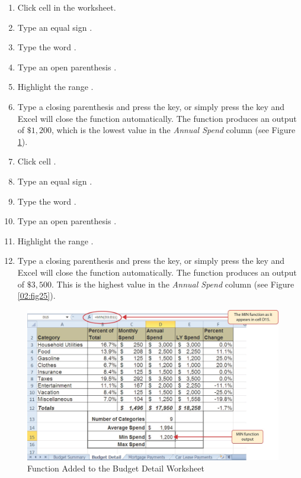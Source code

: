 \begin{enumerate}
	\item Click cell  in the  worksheet.
	\item Type an equal sign \fmtTyping{=}.
	\item Type the word .
	\item Type an open parenthesis \fmtTyping{(}.
	\item Highlight the range .
	\item Type a closing parenthesis \fmtTyping{)} and press the  key, or simply press the  key and Excel will close the function automatically. The  function produces an output of $ \$1,200 $, which is the lowest value in the \textit{Annual Spend} column (see Figure \ref{02:fig24}).
	\item Click cell .
	\item Type an equal sign \fmtTyping{=}.
	\item Type the word .
	\item Type an open parenthesis \fmtTyping{(}.
	\item Highlight the range .
	\item Type a closing parenthesis \fmtTyping{)} and press the  key, or simply press the  key and Excel will close the function automatically. The  function produces an output of $ \$3,500 $. This is the highest value in the \textit{Annual Spend} column (see Figure \ref{02:fig25}).
\end{enumerate}

\begin{figure}[H]
	\centering
	\includegraphics[width=\maxwidth{.95\linewidth}]{gfx/ch02_fig24}
	\caption{ Function Added to the Budget Detail Worksheet}
	\label{02:fig24}
\end{figure}

